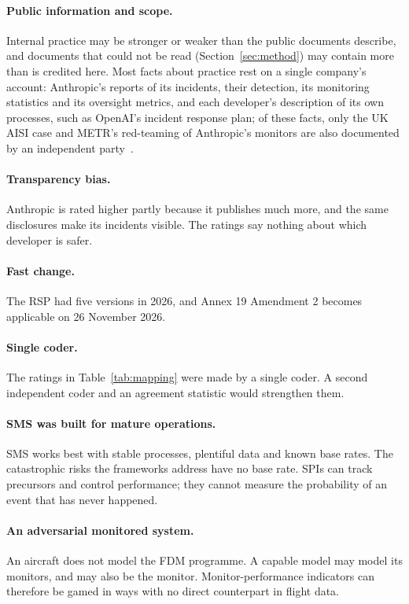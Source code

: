 \documentclass[11pt]{article}
\begin{document}
\paragraph{Public information and scope.} Internal practice may be stronger or weaker than the public documents describe, and documents that could not be read (Section~\ref{sec:method}) may contain more than is credited here. Most facts about practice rest on a single company's account: Anthropic's reports of its incidents, their detection, its monitoring statistics and its oversight metrics, and each developer's description of its own processes, such as OpenAI's incident response plan; of these facts, only the UK AISI case and METR's red-teaming of Anthropic's monitors are also documented by an independent party~\cite{metr2026frr,aisi2026incident}.

\paragraph{Transparency bias.} Anthropic is rated higher partly because it publishes much more, and the same disclosures make its incidents visible. The ratings say nothing about which developer is safer.

\paragraph{Fast change.} The RSP had five versions in 2026, and Annex 19 Amendment 2 becomes applicable on 26 November 2026.

\paragraph{Single coder.} The ratings in Table~\ref{tab:mapping} were made by a single coder. A second independent coder and an agreement statistic would strengthen them.

\paragraph{SMS was built for mature operations.} SMS works best with stable processes, plentiful data and known base rates. The catastrophic risks the frameworks address have no base rate. SPIs can track precursors and control performance; they cannot measure the probability of an event that has never happened.

\paragraph{An adversarial monitored system.} An aircraft does not model the FDM programme. A capable model may model its monitors, and may also be the monitor. Monitor-performance indicators can therefore be gamed in ways with no direct counterpart in flight data.
\end{document}
